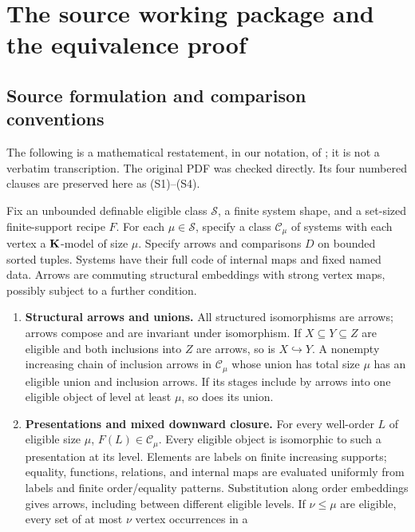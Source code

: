\clearpage
\appendix
\section{The source working package and the equivalence proof}
\label{app:working-equivalence}
\subsection{Source formulation and comparison conventions}
The following is a mathematical restatement, in our notation, of
\cite[Convention 5.1 and Definition 5.2, pp.~29--30]{oai-ecc}; it is
not a verbatim transcription. The original PDF was checked directly.
Its four numbered clauses are preserved here as (S1)--(S4).

\begin{definition}\label{def:source-working}
Fix an unbounded definable eligible class $\mathcal S$, a finite system
shape, and a set-sized finite-support recipe $F$. For each
$\mu\in\mathcal S$, specify a class $\mathcal C_\mu$ of systems with
each vertex a $\mathbf K$-model of size $\mu$. Specify arrows and comparisons
$D$ on bounded sorted tuples. Systems have their full code of internal
maps and fixed named data. Arrows are commuting structural embeddings
with strong vertex maps, possibly subject to a further condition.
\begin{enumerate}[label=\textup{(S\arabic*)},leftmargin=*]
\item \textbf{Structural arrows and unions.}
All structured isomorphisms are arrows; arrows compose and are invariant
under isomorphism. If $X\subseteq Y\subseteq Z$ are eligible and both
inclusions into $Z$ are arrows, so is $X\hookrightarrow Y$.
A nonempty increasing chain of inclusion arrows in $\mathcal C_\mu$
whose union has total size $\mu$ has an eligible union and inclusion
arrows. If its stages include by arrows into one eligible object of
level at least $\mu$, so does its union.
\item \textbf{Presentations and mixed downward closure.}
For every well-order $L$ of eligible size $\mu$, $F(L)\in\mathcal C_\mu$.
Every eligible object is isomorphic to such a presentation at its level.
Elements are labels on finite increasing supports; equality, functions,
relations, and internal maps are evaluated uniformly from labels and
finite order/equality patterns. Substitution along order embeddings gives
arrows, including between different eligible levels. If $\nu\leq\mu$
are eligible, every set of at most $\nu$ vertex occurrences in a

\end{enumerate}
\end{definition}

